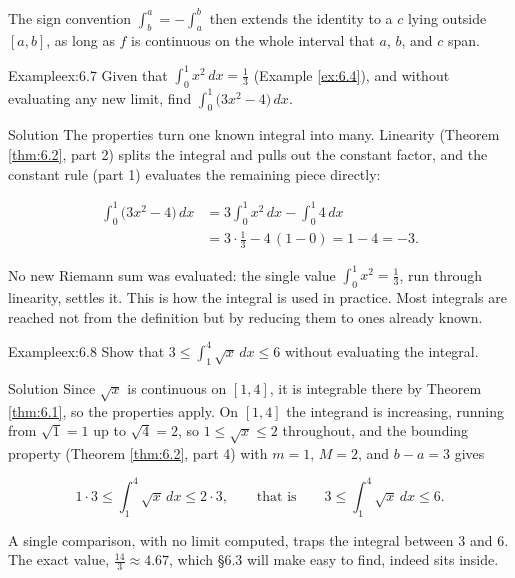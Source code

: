 \documentclass[a4paper,12pt,oneside]{memoir}
\begin{document}
The sign convention \(\int_{b}^{a} = -\int_{a}^{b}\) then extends the identity to a \(c\) lying outside \([a, b]\), as long as \(f\) is continuous on the whole interval that \(a\), \(b\), and \(c\) span.

\begin{workedexample}
\begin{envexample}{Example}{ex:6.7}{}
Given that \(\displaystyle\int_{0}^{1} x^{2}\,dx = \tfrac{1}{3}\) (Example \ref{ex:6.4}), and without evaluating any new limit, find \(\displaystyle\int_{0}^{1} \bigl(3x^{2} - 4\bigr)\,dx\).
\end{envexample}
\begin{envsolution}{Solution}{}{}
The properties turn one known integral into many. Linearity (Theorem \ref{thm:6.2}, part 2) splits the integral and pulls out the constant factor, and the constant rule (part 1) evaluates the remaining piece directly:

\[ \begin{aligned}
          \int_{0}^{1} \bigl(3x^{2} - 4\bigr)\,dx &= 3\int_{0}^{1} x^{2}\,dx - \int_{0}^{1} 4\,dx \\[2pt]
                                                   &= 3\cdot\tfrac{1}{3} - 4\,(1 - 0) = 1 - 4 = -3.
        \end{aligned} \]

No new Riemann sum was evaluated: the single value \(\int_{0}^{1} x^{2} = \tfrac{1}{3}\), run through linearity, settles it. This is how the integral is used in practice. Most integrals are reached not from the definition but by reducing them to ones already known. \qedmark
\end{envsolution}
\end{workedexample}
\begin{workedexample}
\begin{envexample}{Example}{ex:6.8}{}
Show that \(\displaystyle 3 \le \int_{1}^{4} \sqrt{x}\,dx \le 6\) without evaluating the integral.
\end{envexample}
\begin{envsolution}{Solution}{}{}
Since \(\sqrt{x}\) is continuous on \([1, 4]\), it is integrable there by Theorem \ref{thm:6.1}, so the properties apply. On \([1, 4]\) the integrand is increasing, running from \(\sqrt{1} = 1\) up to \(\sqrt{4} = 2\), so \(1 \le \sqrt{x} \le 2\) throughout, and the bounding property (Theorem \ref{thm:6.2}, part 4) with \(m = 1\), \(M = 2\), and \(b - a = 3\) gives

\[ 1 \cdot 3 \le \int_{1}^{4} \sqrt{x}\,dx \le 2 \cdot 3, \qquad\text{that is}\qquad 3 \le \int_{1}^{4} \sqrt{x}\,dx \le 6. \]

A single comparison, with no limit computed, traps the integral between \(3\) and \(6\). The exact value, \(\tfrac{14}{3} \approx 4.67\), which §6.3 will make easy to find, indeed sits inside. \qedmark
\end{envsolution}
\end{workedexample}
\end{document}

